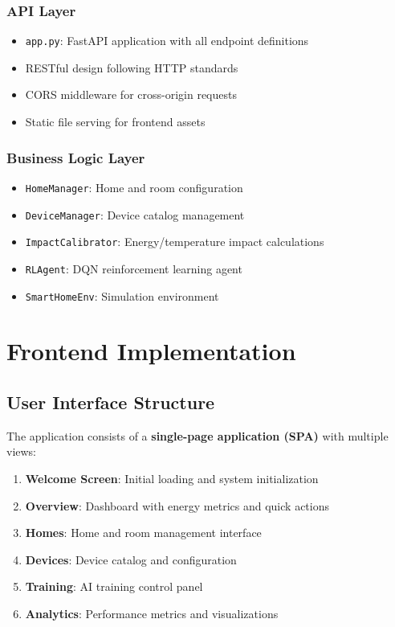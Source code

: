 \documentclass[12pt,a4paper]{article}
\begin{document}
\subsubsection{API Layer}
\begin{itemize}[leftmargin=*]
    \item \texttt{app.py}: FastAPI application with all endpoint definitions
    \item RESTful design following HTTP standards
    \item CORS middleware for cross-origin requests
    \item Static file serving for frontend assets
\end{itemize}

\subsubsection{Business Logic Layer}
\begin{itemize}[leftmargin=*]
    \item \texttt{HomeManager}: Home and room configuration
    \item \texttt{DeviceManager}: Device catalog management
    \item \texttt{ImpactCalibrator}: Energy/temperature impact calculations
    \item \texttt{RLAgent}: DQN reinforcement learning agent
    \item \texttt{SmartHomeEnv}: Simulation environment
\end{itemize}

\section{Frontend Implementation}

\subsection{User Interface Structure}

The application consists of a \textbf{single-page application (SPA)} with multiple views:

\begin{enumerate}[leftmargin=*]
    \item \textbf{Welcome Screen}: Initial loading and system initialization
    \item \textbf{Overview}: Dashboard with energy metrics and quick actions
    \item \textbf{Homes}: Home and room management interface
    \item \textbf{Devices}: Device catalog and configuration
    \item \textbf{Training}: AI training control panel
    \item \textbf{Analytics}: Performance metrics and visualizations
\end{enumerate}
\end{document}
